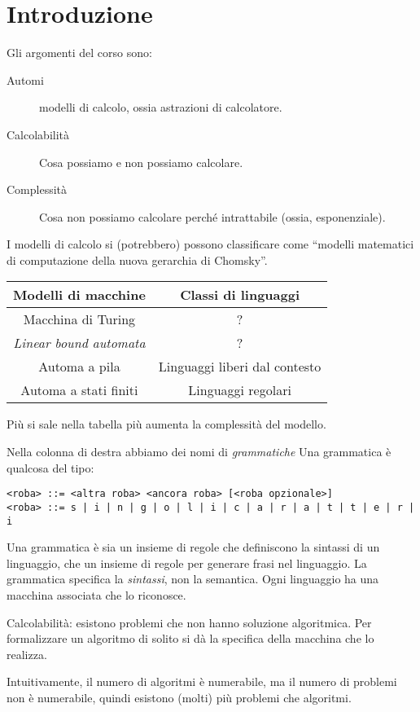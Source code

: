 
\chapter{Introduzione}

Gli argomenti del corso sono:
\begin{description}
	\item[Automi] modelli di calcolo, ossia astrazioni di calcolatore.
	\item[Calcolabilit\`a] Cosa possiamo e non possiamo calcolare.
	\item[Complessit\`a] Cosa non possiamo calcolare perch\'e intrattabile (ossia, esponenziale).
\end{description}

I modelli di calcolo si (potrebbero) possono classificare come ``modelli matematici di computazione della nuova gerarchia di Chomsky''.
\begin{center}
\begin{tabular}{c|c}
	Modelli di macchine & Classi di linguaggi \\
	\hline
	Macchina di Turing & ? \\
	\emph{Linear bound automata} & ? \\
	Automa a pila & Linguaggi liberi dal contesto \\
	Automa a stati finiti & Linguaggi regolari
\end{tabular}
\end{center}

Pi\`u si sale nella tabella pi\`u aumenta la complessit\`a del modello.

Nella colonna di destra abbiamo dei nomi di \emph{grammatiche}
Una grammatica \`e qualcosa del tipo:
\begin{verbatim}
<roba> ::= <altra roba> <ancora roba> [<roba opzionale>]
<roba> ::= s | i | n | g | o | l | i | c | a | r | a | t | t | e | r | i
\end{verbatim}
Una grammatica \`e sia un insieme di regole che definiscono la sintassi di un linguaggio, che un insieme di regole per generare frasi nel linguaggio.
La grammatica specifica la \emph{sintassi}, non la semantica.
Ogni linguaggio ha una macchina associata che lo riconosce.

Calcolabilit\`a: esistono problemi che non hanno soluzione algoritmica.
Per formalizzare un algoritmo di solito si d\`a la specifica della macchina che lo realizza.

Intuitivamente, il numero di algoritmi \`e numerabile, ma il numero di problemi non \`e numerabile, quindi esistono (molti) pi\`u problemi che algoritmi.

